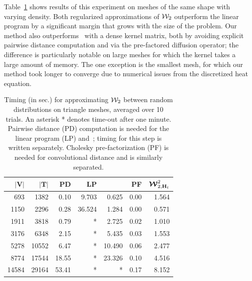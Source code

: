 Table~\ref{table:timing} shows results of this experiment on meshes of the same shape with varying density.  Both regularized approximations of $\mathcal W_2$ outperform the linear program by a significant margin that grows with the size of the problem.  Our method also outperforms~\cite{cuturi-2013} with a dense kernel matrix, both by avoiding explicit pairwise distance computation and via the pre-factored diffusion operator; the difference is particularly notable on large meshes for which the kernel takes a large amount of memory.  The one exception is the smallest mesh, for which our method took longer to converge due to numerical issues from the discretized heat equation.

\begin{table}[t]
\centering
\newcommand{\ts}[0]{\hspace{0.025in}}
{\small
\begin{tabular}{|@{\ts}r@{\ts}|@{\ts}r@{\ts}||@{\ts}r@{\ts}|@{\ts}r@{\ts}|@{\ts}r@{\ts}||@{\ts}r@{\ts}|@{\ts}r@{\ts}|}
\hline
\textbf{$|\boldsymbol{V}|$} & \textbf{$|\boldsymbol{T}|$} & \textbf{PD} & \textbf{LP} & \textbf{\cite{cuturi-2013}} & \textbf{PF} & \textbf{$\boldsymbol{\mathcal W}^2_{2,\mathbf{H}_t}$} \\ \hline
693 & 1382 & 0.10 & 9.703 & 0.625 & 0.00 & 1.564
\\
1150 & 2296 & 0.28 & 36.524 & 1.284 & 0.00 & 0.571
\\
1911 & 3818 & 0.79 & * &  2.725 & 0.02 & 1.010
\\
3176 & 6348 & 2.15 & * & 5.435 & 0.03 & 1.553
\\
5278 & 10552 & 6.47 & * & 10.490 & 0.06 & 2.477
\\
8774  & 17544 & 18.55 & * & 23.326 & 0.10 & 4.516
\\
14584 & 29164 & 53.41 & * & * & 0.17 & 8.152
\\ \hline
\end{tabular}
}
\vspace{-2mm}
\caption{Timing (in sec.) for approximating $\mathcal W_2$ between random distributions on triangle meshes, averaged over 10 trials.  An asterisk * denotes time-out after one minute.  Pairwise distance (PD) computation is needed for the linear program (LP) and~\protect\cite{cuturi-2013}; timing for this step is written separately.  Cholesky pre-factorization (PF) is needed for convolutional distance and is similarly separated.}\label{table:timing}\vspace{-.15in}
\end{table}

